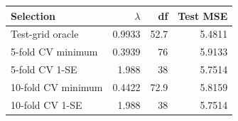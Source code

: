 \begin{center}
\small
\setlength{\tabcolsep}{4pt}
\begin{tabular}{lrrr}
\toprule
Selection & $\lambda$ & df & Test MSE \\
\midrule
Test-grid oracle & 0.9933 & 52.7 & 5.4811 \\
5-fold CV minimum & 0.3939 &   76 & 5.9133 \\
5-fold CV 1-SE & 1.988 &   38 & 5.7514 \\
10-fold CV minimum & 0.4422 & 72.9 & 5.8159 \\
10-fold CV 1-SE & 1.988 &   38 & 5.7514 \\
\bottomrule
\end{tabular}
\end{center}
